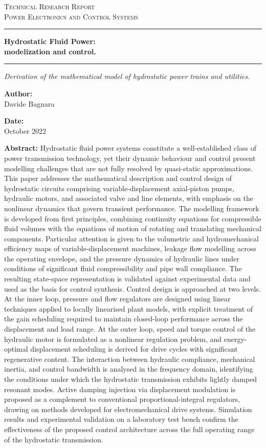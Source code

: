 \documentclass[12pt,a4paper,oneside]{book}
\newcommand{\DocCategory}{Technical Research Report}
\newcommand{\DocField}{Power Electronics and Control Systems}
\newcommand{\DocTitle}{%
	{\fontsize{20}{24}\selectfont\bfseries Hydrostatic Fluid Power:} \\[16pt]
	{\fontsize{16}{20}\selectfont\bfseries modelization and control.}
}
\newcommand{\DocSubtitle}{%
	Derivation of the mathematical model of hydrostatic power trains and utilities. 
}
\newcommand{\DocAuthor}{Davide Bagnara}
\newcommand{\DocDate}{October 2022}
\newcommand{\DocAbstract}{%
	Hydrostatic fluid power systems constitute a well-established class of power transmission technology, yet their dynamic behaviour and control present modelling challenges that are not fully resolved by quasi-static approximations. This paper addresses the mathematical description and control design of hydrostatic circuits comprising variable-displacement axial-piston pumps, hydraulic motors, and associated valve and line elements, with emphasis on the nonlinear dynamics that govern transient performance.
	The modelling framework is developed from first principles, combining continuity equations for compressible fluid volumes with the equations of motion of rotating and translating mechanical components. Particular attention is given to the volumetric and hydromechanical efficiency maps of variable-displacement machines, leakage flow modelling across the operating envelope, and the pressure dynamics of hydraulic lines under conditions of significant fluid compressibility and pipe wall compliance. The resulting state-space representation is validated against experimental data and used as the basis for control synthesis.
	Control design is approached at two levels. At the inner loop, pressure and flow regulators are designed using linear techniques applied to locally linearised plant models, with explicit treatment of the gain scheduling required to maintain closed-loop performance across the displacement and load range. At the outer loop, speed and torque control of the hydraulic motor is formulated as a nonlinear regulation problem, and energy-optimal displacement scheduling is derived for drive cycles with significant regenerative content.
	The interaction between hydraulic compliance, mechanical inertia, and control bandwidth is analysed in the frequency domain, identifying the conditions under which the hydrostatic transmission exhibits lightly damped resonant modes. Active damping injection via displacement modulation is proposed as a complement to conventional proportional-integral regulators, drawing on methods developed for electromechanical drive systems. Simulation results and experimental validation on a laboratory test bench confirm the effectiveness of the proposed control architecture across the full operating range of the hydrostatic transmission. 
}
\begin{document}
	\titlepage
	\begin{center}
		{\Large\scshape \DocCategory}\\[8pt]
		{\large\scshape \DocField}
	\end{center}
	
	\vspace{18pt}
	\noindent\rule{\linewidth}{0.8pt}
	
	\begin{center}
		\DocTitle
	\end{center}
	
	\vspace{4pt}
	\noindent\rule{\linewidth}{2.2pt}
	
	\begin{center}
		\begin{onehalfspace}
			{\large\itshape \DocSubtitle}
		\end{onehalfspace}
	\end{center}
	
	\vspace{18pt}
	
	\begin{minipage}{0.92\linewidth}
		\noindent
		\begin{minipage}[t]{0.48\linewidth}
			\textbf{Author:}\\[2pt]
			\DocAuthor
		\end{minipage}%
		\hfill
		\begin{minipage}[t]{0.48\linewidth}
			\raggedleft
			\textbf{Date:}\\[2pt]
			\DocDate
		\end{minipage}
	\end{minipage}
	\vspace{36pt}
	
	\begin{center}
		\begin{minipage}{0.85\linewidth}
			\footnotesize 
			\begin{onehalfspace}
				\textbf{Abstract:} \DocAbstract
			\end{onehalfspace}
		\end{minipage}
	\end{center}
	
\end{document}

